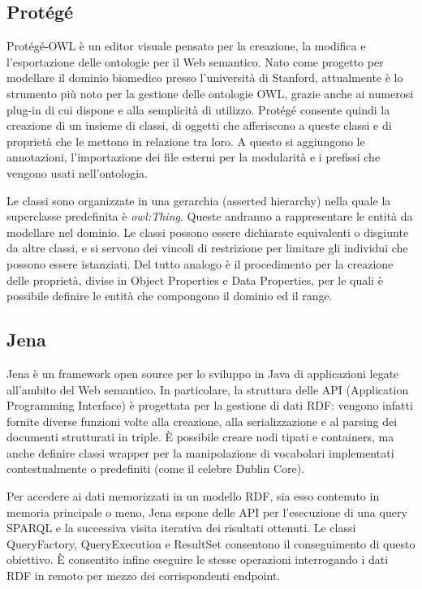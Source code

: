 \documentclass[Lau,binding=0.6cm,noexaminfo,oneside]{sapthesis}
\begin{document}
\subsection{Protégé}

Protégé-OWL è un editor visuale pensato per la creazione, la modifica e l'esportazione delle ontologie per il Web semantico. Nato come progetto per modellare il dominio biomedico presso l'università di Stanford, attualmente è lo strumento più noto per la gestione delle ontologie OWL, grazie anche ai numerosi plug-in di cui dispone e alla semplicità di utilizzo. Protégé consente quindi la creazione di un insieme di classi, di oggetti che afferiscono a queste classi e di proprietà che le mettono in relazione tra loro. A questo si aggiungono le annotazioni, l'importazione dei file esterni per la modularità e i prefissi che vengono usati nell'ontologia.\medskip

Le classi sono organizzate in una gerarchia (asserted hierarchy) nella quale la superclasse predefinita è {\it owl:Thing}. Queste andranno a rappresentare le entità da modellare nel dominio. Le classi possono essere dichiarate equivalenti o disgiunte da altre classi, e si servono dei vincoli di restrizione per limitare gli individui che possono essere istanziati. Del tutto analogo è il procedimento per la creazione delle proprietà, divise in Object Properties e Data Properties, per le quali è possibile definire le entità che compongono il dominio ed il range.

\subsection{Jena}

Jena è un framework open source per lo sviluppo in Java di applicazioni legate all'ambito del Web semantico. In particolare, la struttura delle API (Application Programming Interface) è progettata per la gestione di dati RDF: vengono infatti fornite diverse funzioni volte alla creazione, alla serializzazione e al parsing dei documenti strutturati in triple. \MakeUppercase{è} possibile creare nodi tipati e containers, ma anche definire classi wrapper per la manipolazione di vocabolari implementati contestualmente o predefiniti (come il celebre Dublin Core).\medskip

Per accedere ai dati memorizzati in un modello RDF, sia esso contenuto in memoria principale o meno, Jena espone delle API per l'esecuzione di una query SPARQL e la successiva visita iterativa dei risultati ottenuti. Le classi QueryFactory, QueryExecution e ResultSet consentono il conseguimento di questo obiettivo. \MakeUppercase{è} consentito infine eseguire le stesse operazioni interrogando i dati RDF in remoto per mezzo dei corrispondenti endpoint.
\end{document}
